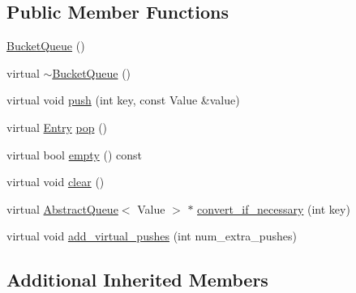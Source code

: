 \subsection*{Public Member Functions}
\begin{DoxyCompactItemize}
\item 
\hyperlink{classBucketQueue_a160b83709a877ee92251c3667fa5d108}{Bucket\-Queue} ()
\item 
virtual \hyperlink{classBucketQueue_aa9afef340657720fda376238977180e5}{$\sim$\-Bucket\-Queue} ()
\item 
virtual void \hyperlink{classBucketQueue_a1dc89d8bd4fd657dfc0218ca947f0d24}{push} (int key, const Value \&value)
\item 
virtual \hyperlink{classAbstractQueue_abe60381528bc4cf9d4032f33f2ff6f3c}{Entry} \hyperlink{classBucketQueue_a2141b91ece1d2180d56ec74f07aa747e}{pop} ()
\item 
virtual bool \hyperlink{classBucketQueue_a3cf60e426df86413789dc19beee350b3}{empty} () const 
\item 
virtual void \hyperlink{classBucketQueue_a749f5dc24bb6bb5754cb78f677b97d26}{clear} ()
\item 
virtual \hyperlink{classAbstractQueue}{Abstract\-Queue}$<$ Value $>$ $\ast$ \hyperlink{classBucketQueue_a4d56a716545e8a2a6e11481cd07d01ac}{convert\-\_\-if\-\_\-necessary} (int key)
\item 
virtual void \hyperlink{classBucketQueue_a362473bbbcf135376ec07be1b651b49d}{add\-\_\-virtual\-\_\-pushes} (int num\-\_\-extra\-\_\-pushes)
\end{DoxyCompactItemize}
\subsection*{Additional Inherited Members}


